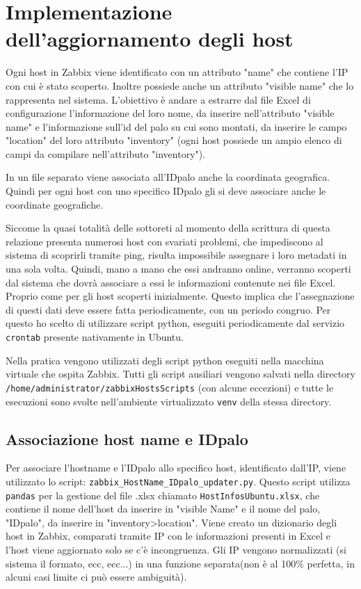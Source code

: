 \documentclass[12pt, a4paper]{report}
\begin{document}
\section{Implementazione dell'aggiornamento degli host}

Ogni host in Zabbix viene identificato con un attributo "name" che contiene l'IP con cui è stato scoperto. 
Inoltre possiede anche un attributo "visible name" che lo rappresenta nel sistema. L'obiettivo è andare a estrarre 
dal file Excel di configurazione l'informazione del loro nome, da inserire nell'attributo "visible name" 
e l'informazione sull'id del palo su cui sono montati, da inserire le campo "location" del loro attributo
"inventory" (ogni host possiede un ampio elenco di campi da compilare nell'attributo "inventory").

In un file separato viene associata all'IDpalo anche la coordinata geografica. 
Quindi per ogni host con uno specifico IDpalo gli si deve associare anche le coordinate geografiche.

Siccome la quasi totalità delle sottoreti al momento della scrittura di questa relazione 
presenta numerosi host con svariati problemi, che impediscono al sistema di scoprirli tramite
ping, risulta impossibile assegnare i loro metadati in una sola volta.
Quindi, mano a mano che essi andranno online, verranno scoperti dal sistema che dovrà associare 
a essi le informazioni contenute nei file Excel. Proprio come per gli host scoperti inizialmente.
Questo implica che l'assegnazione di questi dati deve essere fatta periodicamente, 
con un periodo congruo. Per questo ho scelto di utilizzare script python, eseguiti periodicamente 
dal servizio \texttt{crontab} presente nativamente in Ubuntu.

Nella pratica vengono utilizzati degli script python eseguiti nella macchina virtuale che 
ospita Zabbix. Tutti gli script ausiliari vengono salvati nella directory  
\texttt{/home/administrator/zabbixHostsScripts} (con alcune eccezioni) e tutte le esecuzioni sono svolte nell'ambiente
virtualizzato \texttt{venv} della stessa directory.

\subsection{Associazione host name e IDpalo}
Per associare l'hostname e l'IDpalo allo specifico host, identificato dall'IP, viene utilizzato lo script:
\lstinline|zabbix_HostName_IDpalo_updater.py|.
Questo script utilizza \texttt{pandas} per la gestione del file .xlsx chiamato \lstinline|HostInfosUbuntu.xlsx|, che 
contiene il nome dell'host da inserire in "visible Name" e il nome del palo, "IDpalo", da inserire in 
"inventory>location".
Viene creato un dizionario degli host in Zabbix, comparati tramite IP con le informazioni presenti 
in Excel e l'host viene aggiornato solo se c'è incongruenza. 
Gli IP vengono normalizzati (si sistema il formato, ecc, ecc...) in una funzione separata(non è al 100\% perfetta,
in alcuni casi limite ci può essere ambiguità).
\end{document}
